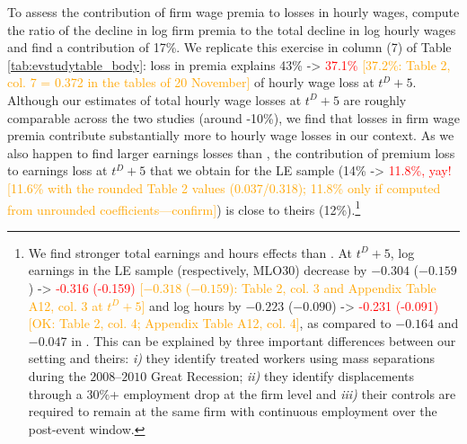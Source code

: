 To assess the contribution of firm wage premia to losses in hourly wages, \cite{Lachowska2020} compute the ratio of the decline in log firm premia to the total decline in log hourly wages and find a contribution of 17\%.
 We replicate this exercise in column (7) of Table \ref{tab:evstudytable_body}: loss in premia explains 43\% -> \textcolor{red}{37.1\%} \textcolor{orange}{[37.2\%: Table 2, col. 7 = 0.372 in the tables of 20 November]} of hourly wage loss at $t^D+5$. Although our estimates of total hourly wage losses at $t^D+5$ are roughly comparable across the two studies (around -10\%), we find that losses in firm wage premia contribute substantially more to hourly wage losses in our context.
 As we also happen to find larger earnings losses than \cite{Lachowska2020}, the contribution of premium loss to earnings loss at $t^D+5$ that we obtain for the LE sample (14\% -> \textcolor{red}{11.8\%, yay!} \textcolor{orange}{[11.6\% with the rounded Table 2 values (0.037/0.318); 11.8\% only if computed from unrounded coefficients---confirm]}) is close to theirs (12\%).\footnote{We find stronger total earnings and hours effects than \cite{Lachowska2020}. At $t^D+5$, log earnings in the LE sample (respectively, MLO30) decrease by $-0.304$ ($-0.159$) -> \textcolor{red}{-0.316 (-0.159)} \textcolor{orange}{[$-0.318$ ($-0.159$): Table 2, col. 3 and Appendix Table A12, col. 3 at $t^D+5$]} and log hours by $-0.223$ ($-0.090$) -> \textcolor{red}{-0.231 (-0.091)} \textcolor{orange}{[OK: Table 2, col. 4; Appendix Table A12, col. 4]}, as compared to $-0.164$ and $-0.047$ in \cite{Lachowska2020}. This can be explained by three important differences between our setting and theirs: \textit{i)} they identify treated workers using mass separations during the $2008$--$2010$ Great Recession; \textit{ii)} they identify displacements through a $30\%$+ employment drop at the firm level and \textit{iii)} their controls are required to remain at the same firm with continuous employment over the post-event window.}

